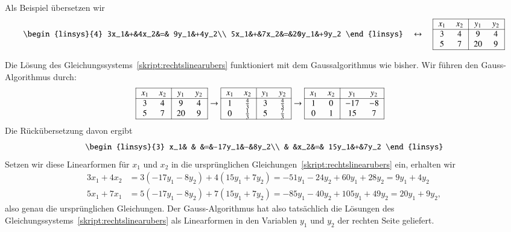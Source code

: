 \begin{beispiel}
\label{skript:lingl:simultan-beispiel}
Als Beispiel übersetzen wir
\begin{equation}
\begin{linsys}{4}
3x_1&+&4x_2&=& 9y_1&+4y_2\\
5x_1&+&7x_2&=&20y_1&+9y_2
\end{linsys}
\quad\leftrightarrow\quad
\begin{tabular}{| >{$}c<{$} >{$}c<{$}| >{$}c<{$} >{$}c<{$}|}
\hline
x_1&x_2&y_1&y_2\\
\hline
3&4&9&4\\
5&7&20&9\\
\hline
\end{tabular}
\label{skript:rechtslinearubers}
\end{equation}

Die Lösung des Gleichungssystems~\eqref{skript:rechtslinearubers} 
funktioniert mit dem Gaussalgorithmus wie bisher.
Wir führen den Gauss-Algorithmus durch:
\begin{align*}
\begin{tabular}{| >{$}c<{$} >{$}c<{$}| >{$}c<{$} >{$}c<{$}|}
\hline
x_1&x_2&y_1&y_2\\
\hline
3&4&9&4\\
5&7&20&9\\
\hline
\end{tabular}
&\rightarrow
\begin{tabular}{| >{$}c<{$} >{$}c<{$}| >{$}c<{$} >{$}c<{$}|}
\hline
x_1&x_2&y_1&y_2\\
\hline
1&\frac{4}{3}&3&\frac{4}{3}\\
0&\frac{1}{3}&5&\frac{7}{3}\\
\hline
\end{tabular}
\rightarrow
\begin{tabular}{| >{$}c<{$} >{$}c<{$}| >{$}c<{$} >{$}c<{$}|}
\hline
x_1&x_2&y_1&y_2\\
\hline
1&0&-17&-8\\
0&1& 15& 7\\
\hline
\end{tabular}
\end{align*}
Die Rückübersetzung davon ergibt
\[
\begin{linsys}{3}
x_1& &   &=&-17y_1&-&8y_2\\
   & &x_2&=& 15y_1&+&7y_2
\end{linsys}
\]
Setzen wir diese Linearformen für $x_1$ und $x_2$ in die ursprünglichen
Gleichungen~\eqref{skript:rechtslinearubers} ein, erhalten
wir
\begin{align*}
3x_1+4x_2
&=
3(-17y_1-8y_2)+4(15y_1+7y_2)
=
-51y_1-24y_2+60y_1+28y_2
=
9y_1+4y_2
\\
5x_1+7x_1
&=
5(-17y_1-8y_2)+7(15y_1+7y_2)
=
-85y_1-40y_2+105y_1+49y_2
=
20y_1+9y_2,
\end{align*}
also genau die ursprünglichen Gleichungen.
Der Gauss-Algorithmus hat also tatsächlich die Lösungen des
Gleichungssystems~\eqref{skript:rechtslinearubers} als
Linearformen in den Variablen $y_1$ und $y_2$ der rechten Seite
geliefert.
\end{beispiel}

